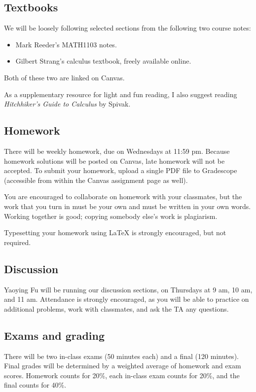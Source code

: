 \documentclass[11pt,oneside]{amsart}
\begin{document}
\subsection*{Textbooks}
We will be loosely following selected sections from the following two course notes:
\begin{itemize}
    \item Mark Reeder's MATH1103 notes.
    \item Gilbert Strang's calculus textbook, freely available online.
\end{itemize}
Both of these two are linked on Canvas.

As a supplementary resource for light and fun reading, I also suggest reading \emph{Hitchhiker's Guide to Calculus} by Spivak.

\subsection*{Homework}
There will be weekly homework, due on Wednesdays at 11:59 pm. Because homework solutions will be posted on Canvas, late homework will not be accepted. To submit your homework, upload a single PDF file to Gradescope (accessible from within the Canvas assignment page as well).

You are encouraged to collaborate on homework with your classmates, but the work that you turn in must be your own and must be written in your own words.  Working together is good; copying somebody else’s work is plagiarism.

Typesetting your homework using LaTeX is strongly encouraged, but not required.

\subsection*{Discussion}
Yaoying Fu will be running our discussion sections, on Thursdays at 9 am, 10 am, and 11 am. Attendance is strongly encouraged, as you will be able to practice on additional problems, work with classmates, and ask the TA any questions.

\subsection*{Exams and grading}
There will be two in-class exams (50 minutes each) and a final (120 minutes). Final grades will be determined by a weighted average of homework and exam scores.  Homework counts for 20\%, each in-class exam counts for 20\%, and the final counts for 40\%.
\end{document}
